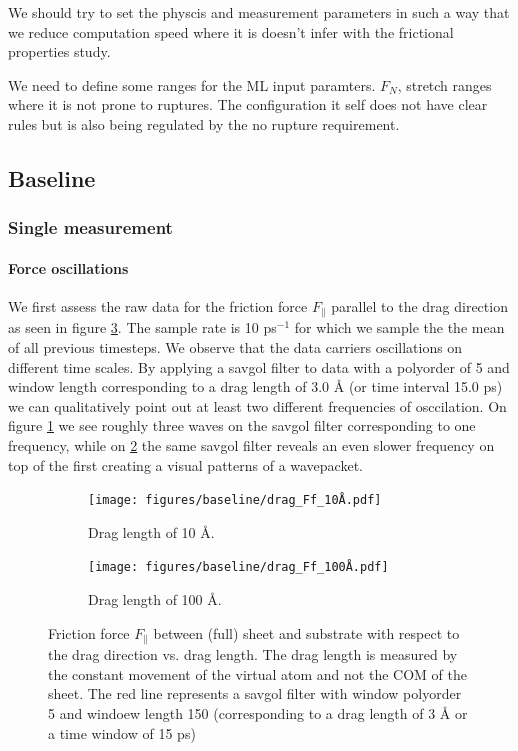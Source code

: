 We should try to set the physcis and measurement parameters in such a way that we reduce computation speed where it is doesn't infer with the frictional properties study.

We need to define some ranges for the ML input paramters. $F_N$, stretch ranges where it is not prone to ruptures. The configuration it self does not have clear rules but is also being regulated by the no rupture requirement. 

\newpage
\subsection{Baseline}

\subsubsection{Single measurement}
\paragraph*{Force oscillations}

We first assess the raw data for the friction force $F_{\parallel}$ parallel to the drag direction as seen in figure \ref{fig:drag_Ff}. The sample rate is 10 ps$^{-1}$ for which we sample the the mean of all previous timesteps. We observe that the data carriers oscillations on different time scales. By applying a savgol filter to data with a polyorder of 5 and window length corresponding to a drag length of 3.0 Å (or time interval 15.0 ps) we can qualitatively point out at least two different frequencies of osccilation. On figure \ref{fig:drag_Ff_10} we see roughly three waves on the savgol filter corresponding to one frequency, while on \ref{fig:drag_Ff_100} the same savgol filter reveals an even slower frequency on top of the first creating a visual patterns of a wavepacket.

\begin{figure}[H]
  \centering
  \begin{subfigure}[b]{0.49\textwidth}
      \centering
      \texttt{[image: figures/baseline/drag\_Ff\_10Å.pdf]}
      \caption{Drag length of 10 Å.}
      \label{fig:drag_Ff_10}
  \end{subfigure}
  \hfill
  \begin{subfigure}[b]{0.49\textwidth}
      \centering
      \texttt{[image: figures/baseline/drag\_Ff\_100Å.pdf]}
      \caption{Drag length of 100 Å.}
      \label{fig:drag_Ff_100}
  \end{subfigure}
  \hfill
     \caption{Friction force $F_\parallel$ between (full) sheet and substrate with respect to the drag direction vs. drag length. The drag length is measured by the constant movement of the virtual atom and not the COM of the sheet. The red line represents a savgol filter with window polyorder 5 and windoew length 150 (corresponding to a drag length of 3 Å or a time window of 15 ps)}
     \label{fig:drag_Ff}
\end{figure}

